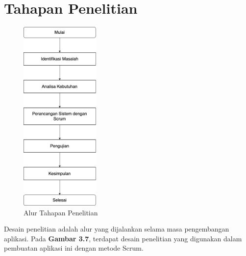 \section{Tahapan Penelitian}

\begin{figure}[H]
	\centering
	\includegraphics[width=0.35\textwidth]{gambar/tahapan_penelitian.png}
	\caption{Alur Tahapan Penelitian}
\end{figure}

Desain penelitian adalah alur yang dijalankan selama masa pengembangan aplikasi. Pada \textbf{Gambar 3.7}, terdapat desain penelitian yang digunakan dalam pembuatan aplikasi ini dengan metode Scrum.






